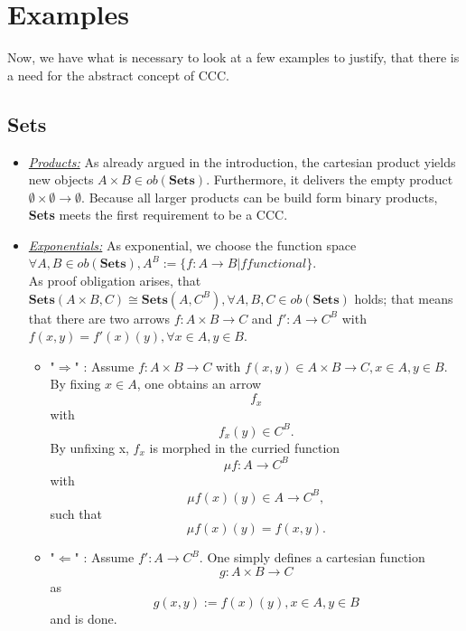 

\section{Examples}
Now, we have what is necessary to look at a few examples to justify, that there is a need for the abstract concept of CCC. 
\subsection{\textbf{Sets}}
\begin{itemize}
\item \underline{\textit{Products:}} As already argued in the introduction, the cartesian product yields new objects $A\times B\in ob(\textbf{Sets})$. Furthermore, it delivers the empty product $\emptyset \times \emptyset \to \emptyset$. Because all larger products can be build form binary products, \textbf{Sets} meets the first requirement to be a CCC. 
\item  \underline{\textit{Exponentials:}} As exponential, we choose the function space $\forall A, B \in ob(\textbf{Sets}), A^B := \{ f: A \to B| f functional\}$.
  \\ As proof obligation arises, that $\textbf{Sets}(A \times B, C ) \cong \textbf{Sets}(A, C^B), \forall A,B,C \in ob(\textbf{Sets})$ holds; that means that there are two arrows $f:A \times B \to C$ and $f':A \to C^B$ with $f (x,y) = f' (x) (y), \forall x \in A, y \in B$.
  \begin{itemize}
\item "$\Rightarrow$" : Assume $f: A \times B \to C$ with $f(x,y) \in A \times B \to C, x \in A, y \in B$.
\\ By fixing $x \in A$, one obtains an arrow $$f_x$$ with $$f_x(y) \in C^B.$$ By unfixing x, $f_x$ is morphed in the curried function $$\mu f:A\to C^B$$ with $$\mu f (x)(y) \in A \to C^B,$$ such that $$\mu f(x)(y)=f(x,y).$$ 
\item "$\Leftarrow$" : Assume $f': A \to C^B$. One simply defines a cartesian function $$g: A \times B \to C$$ as $$g(x,y) := f(x)(y), x \in A, y \in B$$ and is done.
  \end{itemize}
\end{itemize}

